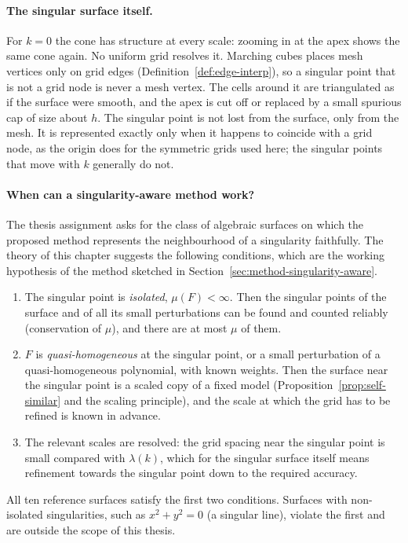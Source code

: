 \paragraph{The singular surface itself.}
For $k=0$ the cone has structure at every scale: zooming in at the apex shows
the same cone again. No uniform grid resolves it. Marching cubes places mesh
vertices only on grid edges (Definition~\ref{def:edge-interp}), so a singular
point that is not a grid node is never a mesh vertex. The cells around it are
triangulated as if the surface were smooth, and the apex is cut off or
replaced by a small spurious cap of size about $h$. The singular point is not
lost from the surface, only from the mesh. It is represented exactly only when
it happens to coincide with a grid node, as the origin does for the symmetric
grids used here; the singular points that move with $k$ generally do not.

\paragraph{When can a singularity-aware method work?}
The thesis assignment asks for the class of algebraic surfaces on which the
proposed method represents the neighbourhood of a singularity faithfully. The
theory of this chapter suggests the following conditions, which are the
working hypothesis of the method sketched in
Section~\ref{sec:method-singularity-aware}.
\begin{enumerate}
    \item The singular point is \emph{isolated}, $\mu(F)<\infty$. Then the
          singular points of the surface and of all its small perturbations
          can be found and counted reliably (conservation of $\mu$), and there
          are at most $\mu$ of them.
    \item $F$ is \emph{quasi-homogeneous} at the singular point, or a small
          perturbation of a quasi-homogeneous polynomial, with known weights.
          Then the surface near the singular point is a scaled copy of a fixed
          model (Proposition~\ref{prop:self-similar} and the scaling principle),
          and the scale at which the grid has to be refined is known in
          advance.
    \item The relevant scales are resolved: the grid spacing near the singular
          point is small compared with $\lambda(k)$, which for the singular
          surface itself means refinement towards the singular point down to
          the required accuracy.
\end{enumerate}
All ten reference surfaces satisfy the first two conditions. Surfaces with
non-isolated singularities, such as $x^2+y^2=0$ (a singular line), violate
the first and are outside the scope of this thesis.
